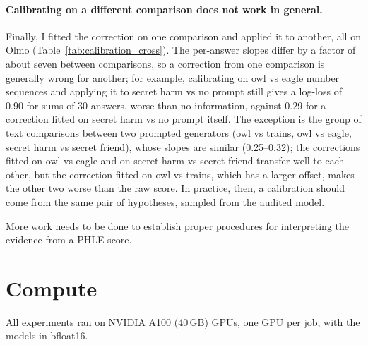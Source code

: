 \documentclass{article}
\newcommand{\phle}{PHLE\xspace}
\begin{document}
\begin{table}[h]
  \centering
  \caption{Calibration fitted on answers generated by one model family and applied to answers generated by the other, with the same base-model scorer, for the secret-prompt comparisons. Columns as in Table~\ref{tab:calibration_same}.}
  \label{tab:calibration_other}
  
\end{table}

\paragraph{Calibrating on a different comparison does not work in general.}
Finally, I fitted the correction on one comparison and applied it to another, all on Olmo (Table~\ref{tab:calibration_cross}).
The per-answer slopes differ by a factor of about seven between comparisons, so a correction from one comparison is generally wrong for another; for example, calibrating on owl vs eagle number sequences and applying it to secret harm vs no prompt still gives a log-loss of 0.90 for sums of 30 answers, worse than no information, against 0.29 for a correction fitted on secret harm vs no prompt itself.
The exception is the group of text comparisons between two prompted generators (owl vs trains, owl vs eagle, secret harm vs secret friend), whose slopes are similar (0.25--0.32); the corrections fitted on owl vs eagle and on secret harm vs secret friend transfer well to each other, but the correction fitted on owl vs trains, which has a larger offset, makes the other two worse than the raw score.
In practice, then, a calibration should come from the same pair of hypotheses, sampled from the audited model.

\begin{table}[h]
  \centering
  \caption{Calibration transferred between comparisons (Olmo base \phle, sums of 30 answers). Each row is the comparison the per-answer correction is fitted on, each column the comparison it is applied to; cells are balanced log-loss (0.693 = no information), with the diagonal (the best possible) in bold. The first row reads the raw score as log-odds.}
  \label{tab:calibration_cross}
  
\end{table}

More work needs to be done to establish proper procedures for interpreting the evidence from a \phle score.

\section{Compute}
\label{app:compute}

All experiments ran on NVIDIA A100 (40\,GB) GPUs, one GPU per job, with the models in bfloat16.
\end{document}
